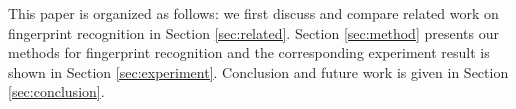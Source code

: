 This paper is organized as follows: we first discuss and compare related work on fingerprint recognition in Section \ref{sec:related}. Section \ref{sec:method} presents our methods for fingerprint recognition and the corresponding experiment result is shown in Section \ref{sec:experiment}. Conclusion and future work is given in Section \ref{sec:conclusion}.